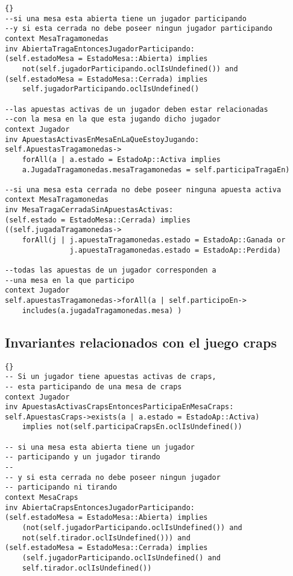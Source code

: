 \begin{framed}
\begin{lstlisting}[frame=trbl]{}
--si una mesa esta abierta tiene un jugador participando 
--y si esta cerrada no debe poseer ningun jugador participando
context MesaTragamonedas
inv AbiertaTragaEntoncesJugadorParticipando:
(self.estadoMesa = EstadoMesa::Abierta) implies 
    not(self.jugadorParticipando.oclIsUndefined()) and
(self.estadoMesa = EstadoMesa::Cerrada) implies 
    self.jugadorParticipando.oclIsUndefined()

--las apuestas activas de un jugador deben estar relacionadas 
--con la mesa en la que esta jugando dicho jugador
context Jugador
inv ApuestasActivasEnMesaEnLaQueEstoyJugando:
self.ApuestasTragamonedas->
    forAll(a | a.estado = EstadoAp::Activa implies 
    a.JugadaTragamonedas.mesaTragamonedas = self.participaTragaEn)

--si una mesa esta cerrada no debe poseer ninguna apuesta activa
context MesaTragamonedas
inv MesaTragaCerradaSinApuestasActivas:
(self.estado = EstadoMesa::Cerrada) implies 
((self.jugadaTragamonedas->
    forAll(j | j.apuestaTragamonedas.estado = EstadoAp::Ganada or 
               j.apuestaTragamonedas.estado = EstadoAp::Perdida)

--todas las apuestas de un jugador corresponden a 
--una mesa en la que participo
context Jugador
self.apuestasTragamonedas->forAll(a | self.participoEn->
    includes(a.jugadaTragamonedas.mesa) )
\end{lstlisting}

\subsection{Invariantes relacionados con el juego craps}

\lstset{language=ocl}
\lstset{commentstyle=\textit}
\begin{lstlisting}[frame=trbl]{}
-- Si un jugador tiene apuestas activas de craps,
-- esta participando de una mesa de craps
context Jugador
inv ApuestasActivasCrapsEntoncesParticipaEnMesaCraps:
self.ApuestasCraps->exists(a | a.estado = EstadoAp::Activa)
    implies not(self.participaCrapsEn.oclIsUndefined())
    
-- si una mesa esta abierta tiene un jugador 
-- participando y un jugador tirando
--
-- y si esta cerrada no debe poseer ningun jugador 
-- participando ni tirando
context MesaCraps
inv AbiertaCrapsEntoncesJugadorParticipando:
(self.estadoMesa = EstadoMesa::Abierta) implies 
    (not(self.jugadorParticipando.oclIsUndefined()) and
    not(self.tirador.oclIsUndefined())) and
(self.estadoMesa = EstadoMesa::Cerrada) implies 
    (self.jugadorParticipando.oclIsUndefined() and
    self.tirador.oclIsUndefined())
    

\end{lstlisting}
\end{framed}
